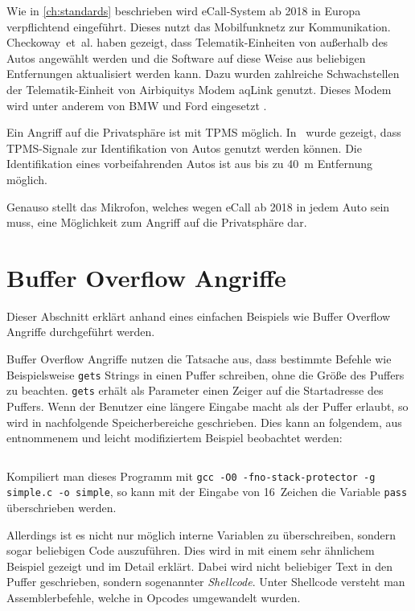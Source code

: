 Wie in \cref{ch:standards} beschrieben wird eCall-System ab 2018 in Europa
verpflichtend eingeführt. Dieses nutzt das Mobilfunknetz zur Kommunikation.
Checkoway~et~al. haben gezeigt, dass Telematik-Einheiten von außerhalb des
Autos angewählt werden und die Software auf diese Weise aus beliebigen
Entfernungen aktualisiert werden kann. Dazu wurden zahlreiche Schwachstellen
der Telematik-Einheit von Airbiquitys Modem aqLink genutzt. Dieses Modem wird
unter anderem von BMW und Ford eingesetzt \cite{AirbiquityBMW,AirbiquityFord}.

Ein Angriff auf die Privatsphäre ist mit TPMS möglich. In~\cite{Rouf2010} wurde
gezeigt, dass TPMS-Signale zur Identifikation von Autos genutzt werden können.
Die Identifikation eines vorbeifahrenden Autos ist aus bis zu \SI{40}{\meter}
Entfernung möglich.

Genauso stellt das Mikrofon, welches wegen eCall ab 2018 in jedem Auto sein
muss, eine Möglichkeit zum Angriff auf die Privatsphäre dar.


\section{Buffer Overflow Angriffe}\label{sec:Buffer-Overflow}
Dieser Abschnitt erklärt anhand eines einfachen Beispiels wie Buffer Overflow
Angriffe durchgeführt werden.

Buffer Overflow Angriffe nutzen die Tatsache aus, dass bestimmte Befehle wie
Beispielsweise \verb+gets+ Strings in einen Puffer schreiben, ohne die Größe
des Puffers zu beachten. \verb+gets+ erhält als Parameter einen Zeiger auf die
Startadresse des Puffers. Wenn der Benutzer eine längere Eingabe macht als der
Puffer erlaubt, so wird in nachfolgende Speicherbereiche geschrieben. Dies kann
an folgendem, aus~\cite{Arora2013} entnommenem und leicht modifiziertem
Beispiel beobachtet werden:

\inputminted[linenos, numbersep=5pt, tabsize=4, frame=lines, label=simple.c]{c}{content/exploit-buffer-overflow/simple.c}

Kompiliert man dieses Programm mit
\verb+gcc -O0 -fno-stack-protector -g simple.c -o simple+, so kann mit der
Eingabe von 16~Zeichen die Variable \verb+pass+ überschrieben werden.

Allerdings ist es nicht nur möglich interne Variablen zu überschreiben, sondern
sogar beliebigen Code auszuführen. Dies wird in \cite{Mixter} mit einem sehr
ähnlichem Beispiel gezeigt und im Detail erklärt. Dabei wird nicht beliebiger
Text in den Puffer geschrieben, sondern sogenannter \textit{Shellcode}. Unter
Shellcode versteht man Assemblerbefehle, welche in Opcodes umgewandelt wurden.


